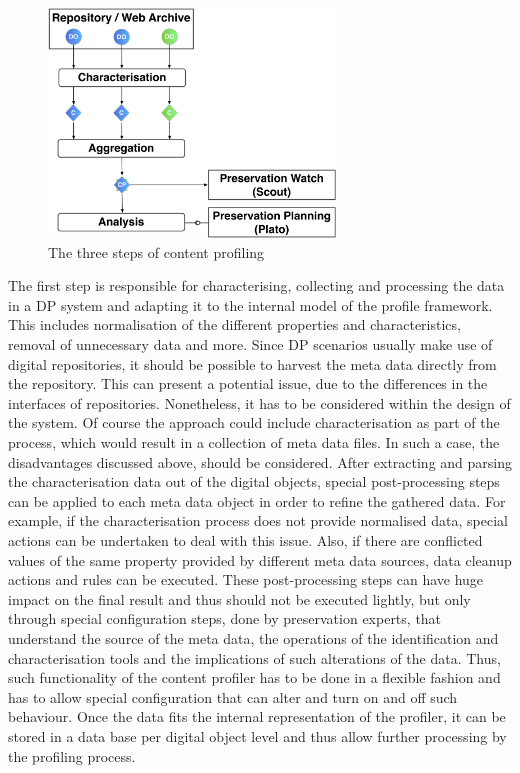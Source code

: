 \begin{figure}[bh]
\begin{center}
\includegraphics[width=3in]{figures/contentprofiling/contentprofiling.png}
\caption{The three steps of content profiling}
\label{fig:cp_threesteps}
\end{center}
\end{figure}

The first step is responsible for characterising, collecting and processing the data in a DP system and adapting it to the internal model of the profile framework. This includes normalisation of the different properties and characteristics, removal of unnecessary data and more. Since DP scenarios usually make use of digital repositories, it should be possible to harvest the meta data directly from the repository. This can present a potential issue, due to the differences in the interfaces of repositories. Nonetheless, it has to be considered within the design of the system. Of course the approach could include characterisation as part of the process, which would result in a collection of meta data files. In such a case, the disadvantages discussed above, should be considered. After extracting and parsing the characterisation data out of the digital objects, special post-processing steps can be applied to each meta data object in order to refine the gathered data. For example, if the characterisation process does not provide normalised data, special actions can be undertaken to deal with this issue. Also, if there are conflicted values of the same property provided by different meta data sources, data cleanup actions and rules can be executed. These post-processing steps can have huge impact on the final result and thus should not be executed lightly, but only through special configuration steps, done by preservation experts, that understand the source of the meta data, the operations of the identification and characterisation tools and the implications of such alterations of the data. Thus, such functionality of the content profiler has to be done in a flexible fashion and has to allow special configuration that can alter and turn on and off such behaviour. Once the data fits the internal representation of the profiler, it can be stored in a data base per digital object level and thus allow further processing by the profiling process.

